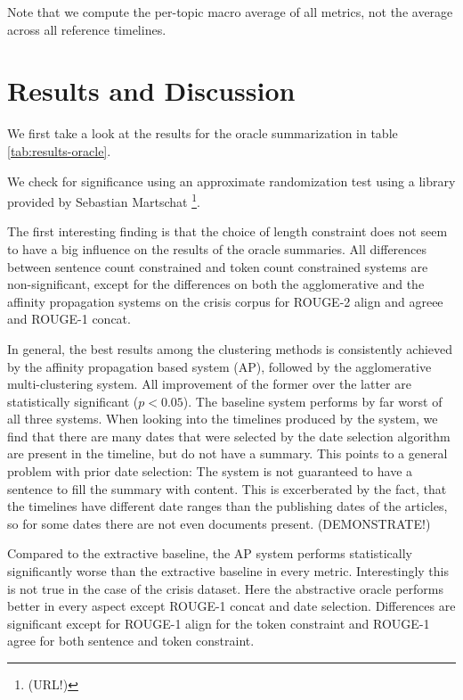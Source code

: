 \documentclass[a4paper,BCOR=10mm]{report}
\begin{document}
Note that we compute the per-topic macro average of all metrics, not the average across all reference timelines.

\section{Results and Discussion}

We first take a look at the results for the oracle summarization in table \ref{tab:results-oracle}.

We check for significance using an approximate randomization test \citet{art} using a library provided by Sebastian Martschat \footnote{(URL!)}. %

The first interesting finding is that the choice of length constraint does not seem to have a big influence on the results of the oracle summaries.
All differences between sentence count constrained and token count constrained systems are non-significant, except for the differences on both the agglomerative and the affinity propagation systems on the crisis corpus for ROUGE-2 align and agreee and ROUGE-1 concat.

In general, the best results among the clustering methods is consistently achieved by the affinity propagation based system (AP), followed by the agglomerative multi-clustering system. All improvement of the former over the latter are statistically significant ($p < 0.05$). The baseline system performs by far worst of all three systems. When looking into the timelines produced by the system, we find that there are many dates that were selected by the date selection algorithm are present in the timeline, but do not have a summary. This points to a general problem with prior date selection: The system is not guaranteed to have a sentence to fill the summary with content. This is excerberated by the fact, that the timelines have different date ranges than the publishing dates of the articles, so for some dates there are not even documents present. (DEMONSTRATE!)

Compared to the extractive baseline, the AP system performs statistically significantly worse than the extractive baseline in every metric.
Interestingly this is not true in the case of the crisis dataset. Here the abstractive oracle performs better in every aspect except ROUGE-1 concat and date selection. Differences are significant except for ROUGE-1 align for the token constraint and ROUGE-1 agree for both sentence and token constraint.
\end{document}
